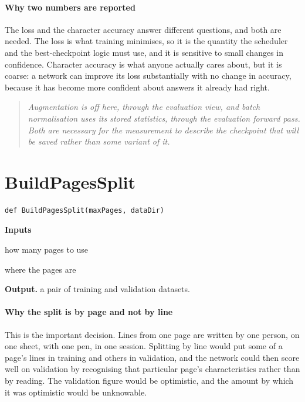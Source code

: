 \paragraph{Why two numbers are reported}
The loss and the character accuracy answer different questions, and both are needed. The loss is what training minimises, so it is the quantity the scheduler and the best-checkpoint logic must use, and it is sensitive to small changes in confidence. Character accuracy is what anyone actually cares about, but it is coarse: a network can improve its loss substantially with no change in accuracy, because it has become more confident about answers it already had right.


\begin{quote}\small\itshape Augmentation is off here, through the evaluation view, and batch normalisation uses its stored statistics, through the evaluation forward pass. Both are necessary for the measurement to describe the checkpoint that will be saved rather than some variant of it.\end{quote}

\section{BuildPagesSplit}
\begin{lstlisting}[style=sig]
def BuildPagesSplit(maxPages, dataDir)
\end{lstlisting}

\noindent\textbf{Inputs}
\begin{description}[leftmargin=2.2em,style=nextline,font=\normalfont\ttfamily]\setlength\itemsep{1pt}
  \item[{maxPages}] \normalfont how many pages to use
  \item[{dataDir}] \normalfont where the pages are
\end{description}

\noindent\textbf{Output.} a pair of training and validation datasets.


\paragraph{Why the split is by page and not by line}
This is the important decision. Lines from one page are written by one person, on one sheet, with one pen, in one session. Splitting by line would put some of a page's lines in training and others in validation, and the network could then score well on validation by recognising that particular page's characteristics rather than by reading. The validation figure would be optimistic, and the amount by which it was optimistic would be unknowable.

